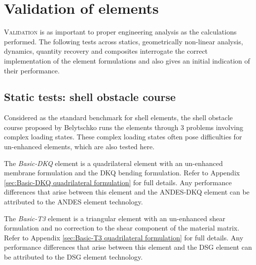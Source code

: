 




\chapter{Validation of elements}

\renewcommand{\Thema}{Validation of elements}

\lettrine[lines=2]{V}{alidation} is as important to proper engineering analysis as the calculations performed. The following tests across statics, geometrically non-linear analysis, dynamics, quantity recovery and composites interrogate the correct implementation of the element formulations and also gives an initial indication of their performance. 

\section{Static tests: shell obstacle course}
\label{section:shell obstacle course}

Considered as the standard benchmark for shell elements, the shell obstacle course proposed by Belytschko \cite{Bel85} runs the elements through 3 problems involving complex loading states. These complex loading states often pose difficulties for un-enhanced elements, which are also tested here.

The \textit{Basic-DKQ} element is a quadrilateral element with an un-enhanced membrane formulation and the DKQ bending formulation. Refer to Appendix \ref{sec:Basic-DKQ quadrilateral formulation} for full details. Any performance differences that arise between this element and the ANDES-DKQ element can be attributed to the ANDES element technology.

The \textit{Basic-T3} element is a triangular element with an un-enhanced shear formulation and no correction to the shear component of the material matrix. Refer to Appendix \ref{sec:Basic-T3 quadrilateral formulation} for full details. Any performance differences that arise between this element and the DSG element can be attributed to the DSG element technology.

